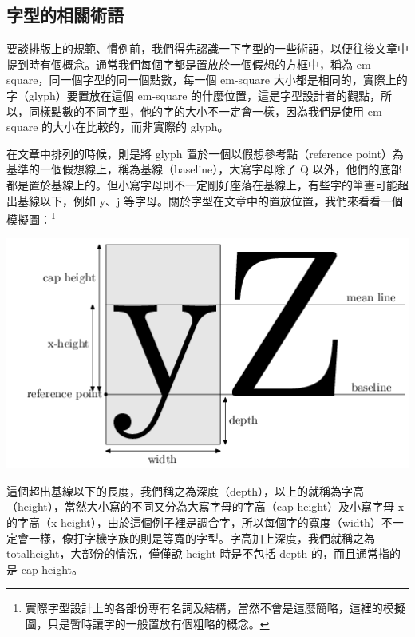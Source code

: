 \subsection{字型的相關術語}
\label{subsec:baseline}

要談排版上的規範、慣例前，我們得先認識一下字型的一些術語，以便往後文章中提到時有個概念。通常我們每個字都是置放於一個假想的方框中，稱為 em-square，同一個字型的同一個點數，每一個 em-square 大小都是相同的，實際上的字（glyph）要置放在這個 em-square 的什麼位置，這是字型設計者的觀點，所以，同樣點數的不同字型，他的字的大小不一定會一樣，因為我們是使用 em-square 的大小在比較的，而非實際的 glyph。

在文章中排列的時候，則是將 glyph 置於一個以假想參考點（reference point）為基準的一個假想線上，稱為基線（baseline），大寫字母除了 Q 以外，他們的底部都是置於基線上的。但小寫字母則不一定剛好座落在基線上，有些字的筆畫可能超出基線以下，例如 y、j 等字母。關於字型在文章中的置放位置，我們來看看一個模擬圖：\footnote{實際字型設計上的各部份專有名詞及結構，當然不會是這麼簡略，這裡的模擬圖，只是暫時讓字的一般置放有個粗略的概念。}

\begin{center}
   \includegraphics{baseline}
\end{center}

這個超出基線以下的長度，我們稱之為深度（depth），以上的就稱為字高（height），當然大小寫的不同又分為大寫字母的字高（cap height）及小寫字母 x 的字高（x-height），由於這個例子裡是調合字，所以每個字的寬度（width）不一定會一樣，像打字機字族的則是等寬的字型。字高加上深度，我們就稱之為 totalheight，大部份的情況，僅僅說 height 時是不包括 depth 的，而且通常指的是 cap height。

